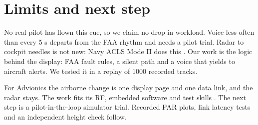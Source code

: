 \documentclass{ideathon2026}
\begin{document}
\section{Limits and next step}
No real pilot has flown this cue, so we claim no drop in workload. Voice less often than every 5 s departs from the FAA rhythm and needs
a pilot trial. Radar to cockpit needles is not new: Navy ACLS Mode II does this \cite{fas,jo}. Our work is the logic behind the display:
FAA fault rules, a silent path and a voice that yields to aircraft alerts. We tested it in a replay of 1000 recorded tracks.

For Advionics the airborne change is one display page and one data link, and the radar stays. The work fits its RF, embedded software and
test skills \cite{advionics}. The next step is a pilot-in-the-loop simulator trial. Recorded PAR plots, link latency tests and an
independent height check follow.
\end{document}
